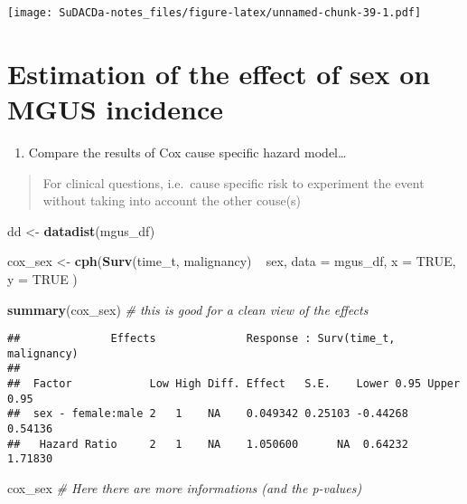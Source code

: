 \documentclass[]{book}
\newenvironment{Shaded}{\begin{snugshade}}{\end{snugshade}}
\newcommand{\KeywordTok}[1]{\textcolor[rgb]{0.13,0.29,0.53}{\textbf{{#1}}}}
\newcommand{\DataTypeTok}[1]{\textcolor[rgb]{0.13,0.29,0.53}{{#1}}}
\newcommand{\StringTok}[1]{\textcolor[rgb]{0.31,0.60,0.02}{{#1}}}
\newcommand{\CommentTok}[1]{\textcolor[rgb]{0.56,0.35,0.01}{\textit{{#1}}}}
\newcommand{\OtherTok}[1]{\textcolor[rgb]{0.56,0.35,0.01}{{#1}}}
\newcommand{\NormalTok}[1]{{#1}}
\providecommand{\tightlist}{%
  \setlength{\itemsep}{0pt}\setlength{\parskip}{0pt}}
\theoremstyle{definition}
\theoremstyle{definition}
\theoremstyle{definition}
\theoremstyle{remark}
\begin{document}
\texttt{[image: SuDACDa-notes\_files/figure-latex/unnamed-chunk-39-1.pdf]}

\section{Estimation of the effect of sex on MGUS
incidence}\label{estimation-of-the-effect-of-sex-on-mgus-incidence}

\begin{enumerate}
\def\labelenumi{\arabic{enumi}.}
\tightlist
\item
  Compare the results of Cox cause specific hazard model\ldots{}
\end{enumerate}

\begin{quote}
For clinical questions, i.e.~cause specific risk to experiment the event
without taking into account the other couse(s)
\end{quote}

\begin{Shaded}
\begin{Highlighting}[]
\NormalTok{dd <-}\StringTok{ }\KeywordTok{datadist}\NormalTok{(mgus_df)}

\NormalTok{cox_sex <-}\StringTok{ }\KeywordTok{cph}\NormalTok{(}\KeywordTok{Surv}\NormalTok{(time_t, malignancy) ~}\StringTok{ }\NormalTok{sex,}
  \DataTypeTok{data =} \NormalTok{mgus_df,}
  \DataTypeTok{x    =} \OtherTok{TRUE}\NormalTok{,}
  \DataTypeTok{y    =} \OtherTok{TRUE}
\NormalTok{)}

\KeywordTok{summary}\NormalTok{(cox_sex)                  }\CommentTok{# this is good for a clean view of the effects}
\end{Highlighting}
\end{Shaded}

\begin{verbatim}
##              Effects              Response : Surv(time_t, malignancy) 
## 
##  Factor            Low High Diff. Effect   S.E.    Lower 0.95 Upper 0.95
##  sex - female:male 2   1    NA    0.049342 0.25103 -0.44268   0.54136   
##   Hazard Ratio     2   1    NA    1.050600      NA  0.64232   1.71830
\end{verbatim}

\begin{Shaded}
\begin{Highlighting}[]
\NormalTok{cox_sex                    }\CommentTok{# Here there are more informations (and the p-values)}
\end{Highlighting}
\end{Shaded}
\end{document}
